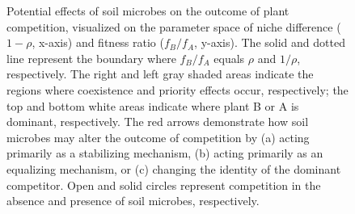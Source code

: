 \clearpage
\begin{figure}[h!]
	\centering
	\caption[Potential effects of soil microbes on the outcome of plant competition, visualized on the parameter space of niche difference and fitness ratio.]
		{\hspace{1mm}Potential effects of soil microbes on the outcome of plant competition, visualized on the parameter space of niche difference ($1 - \rho$, x-axis) and fitness ratio ($f_{B}/f_{A}$, y-axis). The solid and dotted line represent the boundary where $f_{B}/f_{A}$ equals $\rho$ and $1/\rho$, respectively. The right and left gray shaded areas indicate the regions where coexistence and priority effects occur, respectively; the top and bottom white areas indicate where plant B or A is dominant, respectively. The red arrows demonstrate how soil microbes may alter the outcome of competition by (a) acting primarily as a stabilizing mechanism, (b) acting primarily as an equalizing mechanism, or (c) changing the identity of the dominant competitor. Open and solid circles represent competition in the absence and presence of soil microbes, respectively.}
	\label{fig:PopChessonSpace}
\end{figure}



